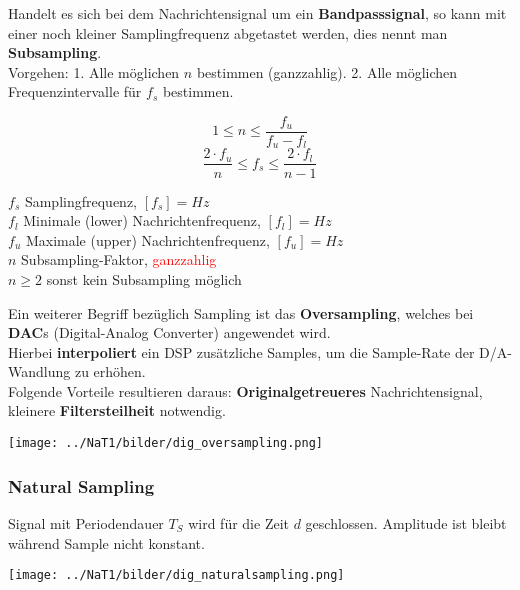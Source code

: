 Handelt es sich bei dem Nachrichtensignal um ein \textbf{Bandpasssignal}, so kann mit einer noch
kleiner Samplingfrequenz abgetastet werden, dies nennt man \textbf{Subsampling}. \\
Vorgehen: 1. Alle möglichen $n$ bestimmen (ganzzahlig). 2. Alle möglichen Frequenzintervalle für
$f_s$ bestimmen.

\begin{minipage}[t][2cm][c]{10cm}
$$ 1 \leq n \leq \frac{f_u}{f_u - f_l} $$
$$ \frac{2 \cdot f_u}{n} \leq f_s \leq \frac{2 \cdot f_l}{n-1}$$
\end{minipage}
\begin{minipage}[t][2cm][c]{8cm}
	$f_s$ Samplingfrequenz, $[f_s] = Hz$ \\
	$f_l$ Minimale (lower) Nachrichtenfrequenz, $[f_l] = Hz$ \\
	$f_u$ Maximale (upper) Nachrichtenfrequenz, $[f_u] = Hz$ \\
	$n$ Subsampling-Faktor, \textcolor{red}{ganzzahlig} \\
	$n \geq 2$ sonst kein Subsampling möglich
\end{minipage}

Ein weiterer Begriff bezüglich Sampling ist das \textbf{Oversampling}, welches bei \textbf{DAC}s
(Digital-Analog Converter) angewendet wird. \\
Hierbei \textbf{interpoliert} ein DSP zusätzliche Samples, um die Sample-Rate der D/A-Wandlung zu
erhöhen.\\
Folgende Vorteile resultieren daraus: \textbf{Originalgetreueres} Nachrichtensignal, kleinere
\textbf{Filtersteilheit} notwendig.
	\begin{center}
		\texttt{[image: ../NaT1/bilder/dig\_oversampling.png]}
	\end{center}

\subsubsection{Natural Sampling}
Signal mit Periodendauer $T_S$ wird für die Zeit $d$ geschlossen. Amplitude ist bleibt
während Sample nicht konstant. \\

	\begin{center}
		\texttt{[image: ../NaT1/bilder/dig\_naturalsampling.png]}
	\end{center}

